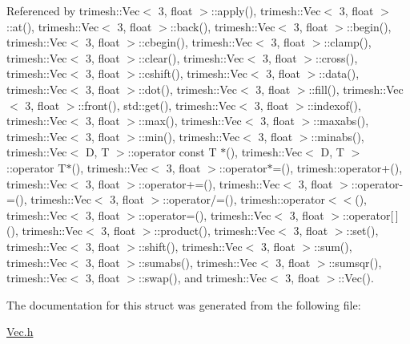 Referenced by trimesh\+::\+Vec$<$ 3, float $>$\+::apply(), trimesh\+::\+Vec$<$ 3, float $>$\+::at(), trimesh\+::\+Vec$<$ 3, float $>$\+::back(), trimesh\+::\+Vec$<$ 3, float $>$\+::begin(), trimesh\+::\+Vec$<$ 3, float $>$\+::cbegin(), trimesh\+::\+Vec$<$ 3, float $>$\+::clamp(), trimesh\+::\+Vec$<$ 3, float $>$\+::clear(), trimesh\+::\+Vec$<$ 3, float $>$\+::cross(), trimesh\+::\+Vec$<$ 3, float $>$\+::cshift(), trimesh\+::\+Vec$<$ 3, float $>$\+::data(), trimesh\+::\+Vec$<$ 3, float $>$\+::dot(), trimesh\+::\+Vec$<$ 3, float $>$\+::fill(), trimesh\+::\+Vec$<$ 3, float $>$\+::front(), std\+::get(), trimesh\+::\+Vec$<$ 3, float $>$\+::indexof(), trimesh\+::\+Vec$<$ 3, float $>$\+::max(), trimesh\+::\+Vec$<$ 3, float $>$\+::maxabs(), trimesh\+::\+Vec$<$ 3, float $>$\+::min(), trimesh\+::\+Vec$<$ 3, float $>$\+::minabs(), trimesh\+::\+Vec$<$ D, T $>$\+::operator const T $\ast$(), trimesh\+::\+Vec$<$ D, T $>$\+::operator T$\ast$(), trimesh\+::\+Vec$<$ 3, float $>$\+::operator$\ast$=(), trimesh\+::operator+(), trimesh\+::\+Vec$<$ 3, float $>$\+::operator+=(), trimesh\+::\+Vec$<$ 3, float $>$\+::operator-\/=(), trimesh\+::\+Vec$<$ 3, float $>$\+::operator/=(), trimesh\+::operator$<$$<$(), trimesh\+::\+Vec$<$ 3, float $>$\+::operator=(), trimesh\+::\+Vec$<$ 3, float $>$\+::operator\mbox{[}$\,$\mbox{]}(), trimesh\+::\+Vec$<$ 3, float $>$\+::product(), trimesh\+::\+Vec$<$ 3, float $>$\+::set(), trimesh\+::\+Vec$<$ 3, float $>$\+::shift(), trimesh\+::\+Vec$<$ 3, float $>$\+::sum(), trimesh\+::\+Vec$<$ 3, float $>$\+::sumabs(), trimesh\+::\+Vec$<$ 3, float $>$\+::sumsqr(), trimesh\+::\+Vec$<$ 3, float $>$\+::swap(), and trimesh\+::\+Vec$<$ 3, float $>$\+::\+Vec().



The documentation for this struct was generated from the following file\+:\begin{DoxyCompactItemize}
\item 
\hyperlink{Vec_8h}{Vec.\+h}\end{DoxyCompactItemize}
